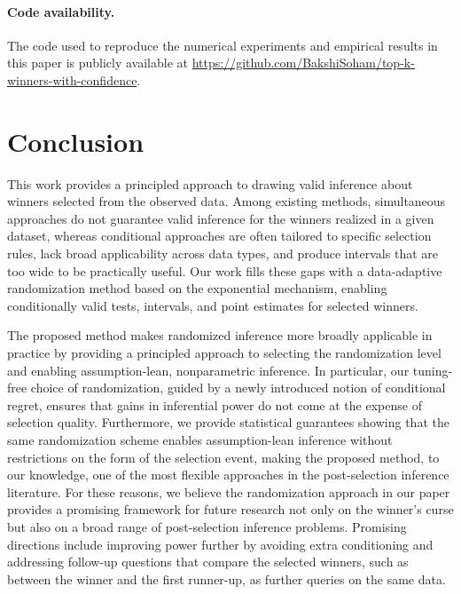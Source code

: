 \documentclass[12pt]{article}
\begin{document}
\paragraph{Code availability.}
The code used to reproduce the numerical experiments and empirical results in this paper is publicly available at
\url{https://github.com/BakshiSoham/top-k-winners-with-confidence}.

\section{Conclusion}

This work provides a principled approach to drawing valid inference about winners selected from the observed data.
Among existing methods, simultaneous approaches do not guarantee valid inference for the winners realized in a given dataset, whereas conditional approaches are often tailored to specific selection rules, lack broad applicability across data types, and produce intervals that are too wide to be practically useful. 
Our work fills these gaps with a data-adaptive randomization method based on the exponential mechanism, enabling conditionally valid tests, intervals, and point estimates for selected winners.

The proposed method makes randomized inference more broadly applicable in practice by providing a principled approach to selecting the randomization level and enabling assumption-lean, nonparametric inference.
In particular, our tuning-free choice of randomization, guided by a newly introduced notion of conditional regret, ensures that gains in inferential power do not come at the expense of selection quality. Furthermore, we provide statistical guarantees showing that the same randomization scheme enables assumption-lean inference without restrictions on the form of the selection event, making the proposed method, to our knowledge, one of the most flexible approaches in the post-selection inference literature.
For these reasons, we believe the randomization approach in our paper provides a promising framework for future research not only on the winner’s curse but also on a broad range of post-selection inference problems. Promising directions include improving power further by avoiding extra conditioning and addressing follow-up questions that compare the selected winners, such as between the winner and the first runner-up, as further queries on the same data.

\end{document}
